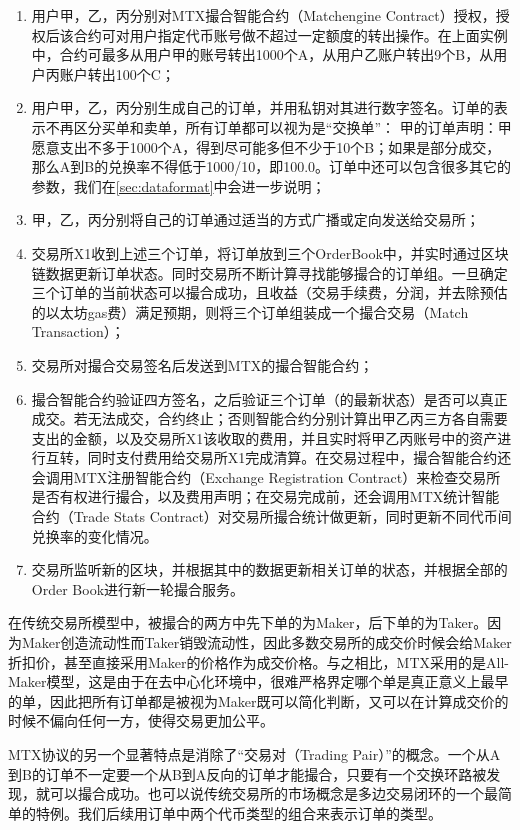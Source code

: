 \documentclass[UTF8,nofonts]{ctexart}
\begin{document}
\begin{enumerate}
	\item 用户甲，乙，丙分别对MTX撮合智能合约（Matchengine Contract）授权，授权后该合约可对用户指定代币账号做不超过一定额度的转出操作。在上面实例中，合约可最多从用户甲的账号转出1000个A，从用户乙账户转出9个B，从用户丙账户转出100个C；
	\item 用户甲，乙，丙分别生成自己的订单，并用私钥对其进行数字签名。订单的表示不再区分买单和卖单，所有订单都可以视为是“交换单”： 甲的订单声明：甲愿意支出不多于1000个A，得到尽可能多但不少于10个B；如果是部分成交，那么A到B的兑换率不得低于1000/10，即100.0。订单中还可以包含很多其它的参数，我们在\ref{sec:dataformat}中会进一步说明；
	\item 甲，乙，丙分别将自己的订单通过适当的方式广播或定向发送给交易所；
	\item 交易所X1收到上述三个订单，将订单放到三个OrderBook中，并实时通过区块链数据更新订单状态。同时交易所不断计算寻找能够撮合的订单组。一旦确定三个订单的当前状态可以撮合成功，且收益（交易手续费，分润，并去除预估的以太坊gas费）满足预期，则将三个订单组装成一个撮合交易（Match Transaction）；
	\item 交易所对撮合交易签名后发送到MTX的撮合智能合约；
	\item 撮合智能合约验证四方签名，之后验证三个订单（的最新状态）是否可以真正成交。若无法成交，合约终止；否则智能合约分别计算出甲乙丙三方各自需要支出的金额，以及交易所X1该收取的费用，并且实时将甲乙丙账号中的资产进行互转，同时支付费用给交易所X1完成清算。在交易过程中，撮合智能合约还会调用MTX注册智能合约（Exchange Registration Contract）来检查交易所是否有权进行撮合，以及费用声明；在交易完成前，还会调用MTX统计智能合约（Trade Stats Contract）对交易所撮合统计做更新，同时更新不同代币间兑换率的变化情况。
	\item 交易所监听新的区块，并根据其中的数据更新相关订单的状态，并根据全部的Order Book进行新一轮撮合服务。
\end{enumerate}

在传统交易所模型中，被撮合的两方中先下单的为Maker，后下单的为Taker。因为Maker创造流动性而Taker销毁流动性，因此多数交易所的成交价时候会给Maker折扣价，甚至直接采用Maker的价格作为成交价格。与之相比，MTX采用的是All-Maker模型，这是由于在去中心化环境中，很难严格界定哪个单是真正意义上最早的单，因此把所有订单都是被视为Maker既可以简化判断，又可以在计算成交价的时候不偏向任何一方，使得交易更加公平。

MTX协议的另一个显著特点是消除了“交易对（Trading Pair）”的概念。一个从A到B的订单不一定要一个从B到A反向的订单才能撮合，只要有一个交换环路被发现，就可以撮合成功。也可以说传统交易所的市场概念是多边交易闭环的一个最简单的特例。我们后续用订单中两个代币类型的组合来表示订单的类型。
\end{document}

